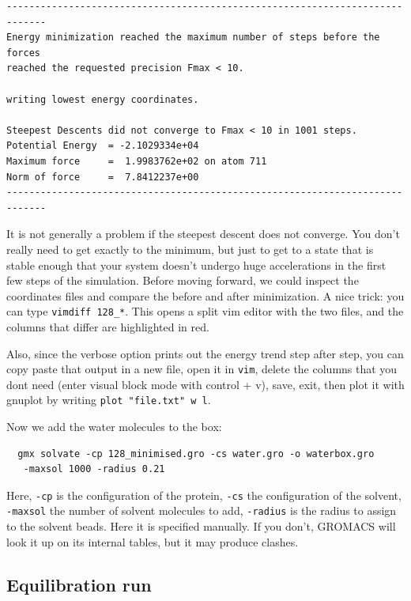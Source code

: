 {
  \small
\begin{verbatim}
-----------------------------------------------------------------------------
Energy minimization reached the maximum number of steps before the forces
reached the requested precision Fmax < 10.

writing lowest energy coordinates.

Steepest Descents did not converge to Fmax < 10 in 1001 steps.
Potential Energy  = -2.1029334e+04
Maximum force     =  1.9983762e+02 on atom 711
Norm of force     =  7.8412237e+00
-----------------------------------------------------------------------------
\end{verbatim}
}
It is not generally a problem if the steepest descent does not converge. You don't really need
to get exactly to the minimum, but just to get to a state that is stable enough that your system doesn't 
undergo huge accelerations in the first few steps of the simulation. Before moving forward, we could inspect the 
coordinates files and compare the before and after minimization. A nice trick: you can type \texttt{vimdiff 128\_*}. This opens a split vim 
editor with the two files, and the columns that differ are highlighted in red. 

Also, since the verbose option prints out the energy trend step after step, you can copy paste that output in a new file, open it in \texttt{vim},
delete the columns that you dont need (enter visual block mode with control + v), save, exit, then plot it with gnuplot by writing
\texttt{plot "file.txt" w l}.  


Now we add the water molecules to the box:

\begin{verbatim}
  gmx solvate -cp 128_minimised.gro -cs water.gro -o waterbox.gro
   -maxsol 1000 -radius 0.21
\end{verbatim}

Here, \texttt{-cp} is the configuration of the protein, \texttt{-cs} the configuration of the solvent,
\texttt{-maxsol} the number of solvent molecules to add, \texttt{-radius} is the radius to assign to the solvent beads.
Here it is specified manually. If you don't, GROMACS will look it up on its internal tables, but it may produce clashes. 




\subsection{Equilibration run}

